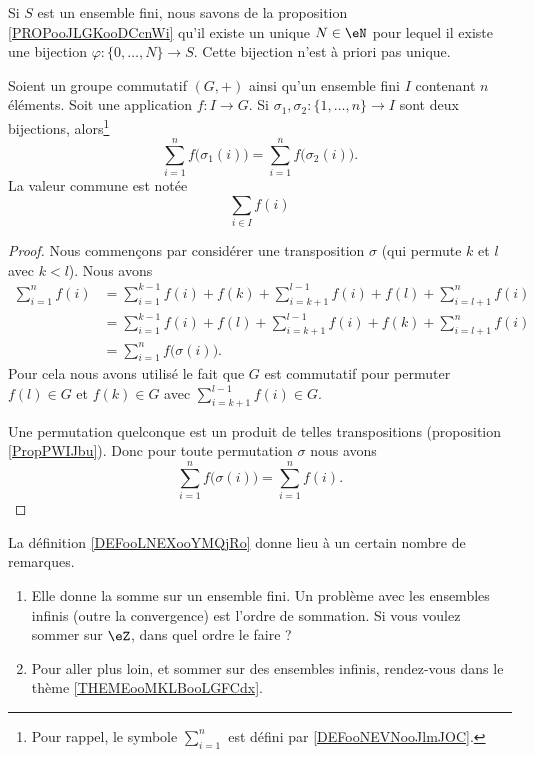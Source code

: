 Si \( S\) est un ensemble fini, nous savons de la proposition \ref{PROPooJLGKooDCcnWi} qu'il existe un unique \( N\in \eN\) pour lequel il existe une bijection \( \varphi\colon \{ 0,\ldots, N \}\to S\). Cette bijection n'est à priori pas unique.

\begin{lemmaDef}       \label{DEFooLNEXooYMQjRo}
	Soient un groupe commutatif \( (G,+)\) ainsi qu'un ensemble fini \( I\) contenant \( n\) éléments. Soit une application \( f\colon I\to G \). Si \( \sigma_1,\sigma_2\colon \{1,\ldots, n \}\to I\) sont deux bijections, alors\footnote{Pour rappel, le symbole \( \sum_{i=1}^n\) est défini par \ref{DEFooNEVNooJlmJOC}.}
	\begin{equation}
		\sum_{i=1}^nf\big( \sigma_1(i) \big)=\sum_{i=1}^nf\big( \sigma_2(i) \big).
	\end{equation}
	La valeur commune est notée
	\begin{equation}	\label{EQooWTTJooIJEbrV}
		\sum_{i\in I}f(i)
	\end{equation}
\end{lemmaDef}

\begin{proof}
	Nous commençons par considérer une transposition \( \sigma\) (qui permute \( k\) et \( l\) avec \( k<l\)). Nous avons
	\begin{subequations}
		\begin{align}
			\sum_{i=1}^nf(i) & =\sum_{i=1}^{k-1}f(i)+f(k)+\sum_{i=k+1}^{l-1}f(i)+f(l)+\sum_{i=l+1}^nf(i) \\
			                 & =\sum_{i=1}^{k-1}f(i)+f(l)+\sum_{i=k+1}^{l-1}f(i)+f(k)+\sum_{i=l+1}^nf(i) \\
			                 & =\sum_{i=1}^nf\big( \sigma(i) \big).
		\end{align}
	\end{subequations}
	Pour cela nous avons utilisé le fait que \( G\) est commutatif pour permuter \( f(l)\in G\) et \( f(k)\in G\) avec \( \sum_{i=k+1}^{l-1}f(i)\in G\).

	Une permutation quelconque est un produit de telles transpositions (proposition \ref{PropPWIJbu}). Donc pour toute permutation \( \sigma\) nous avons
	\begin{equation}
		\sum_{i=1}^nf\big( \sigma(i) \big)=\sum_{i=1}^nf(i).
	\end{equation}
\end{proof}

La définition \ref{DEFooLNEXooYMQjRo} donne lieu à un certain nombre de remarques.
\begin{enumerate}
	\item
	      Elle donne la somme sur un ensemble fini. Un problème avec les ensembles infinis (outre la convergence) est l'ordre de sommation. Si vous voulez sommer sur \( \eZ\), dans quel ordre le faire ?
	\item
	      Pour aller plus loin, et sommer sur des ensembles infinis, rendez-vous dans le thème \ref{THEMEooMKLBooLGFCdx}.
\end{enumerate}

